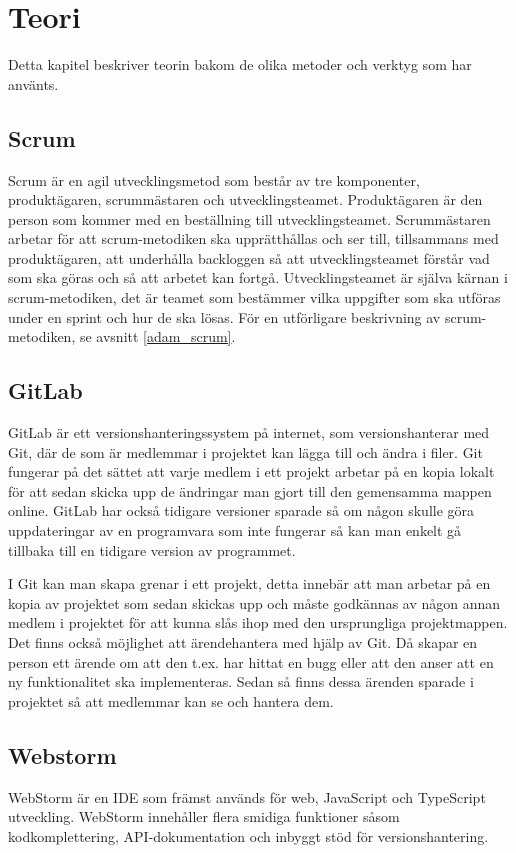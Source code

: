 \chapter{Teori}
Detta kapitel beskriver teorin bakom de olika metoder och verktyg som har använts.

\section{Scrum} \label{scrum}
Scrum är en agil utvecklingsmetod som består av tre komponenter, produktägaren, scrummästaren och utvecklingsteamet. 
Produktägaren är den person som kommer med en beställning till utvecklingsteamet. 
Scrummästaren arbetar för att scrum-metodiken ska upprätthållas och ser till, tillsammans med produktägaren, att underhålla backloggen så att utvecklingsteamet förstår vad som ska göras och så att arbetet kan fortgå. 
Utvecklingsteamet är själva kärnan i scrum-metodiken, det är teamet som bestämmer vilka uppgifter som ska utföras under en sprint och hur de ska lösas. 
För en utförligare beskrivning av scrum-metodiken, se avsnitt \ref{adam_scrum}.

\section{GitLab}
GitLab är ett versionshanteringssystem på internet, som versionshanterar med Git, där de som är medlemmar i projektet kan lägga till och ändra i filer. 
Git fungerar på det sättet att varje medlem i ett projekt arbetar på en kopia lokalt för att sedan skicka upp de ändringar man gjort till den gemensamma mappen online. 
GitLab har också tidigare versioner sparade så om någon skulle göra uppdateringar av en programvara som inte fungerar så kan man enkelt gå tillbaka till en tidigare version av programmet.

I Git kan man skapa grenar i ett projekt, detta innebär att man arbetar på en kopia av projektet som sedan skickas upp och måste godkännas av någon annan medlem i projektet för att kunna slås ihop med den ursprungliga projektmappen. 
Det finns också möjlighet att ärendehantera med hjälp av Git. 
Då skapar en person ett ärende om att den t.ex. har hittat en bugg eller att den anser att en ny funktionalitet ska implementeras. 
Sedan så finns dessa ärenden sparade i projektet så att medlemmar kan se och hantera dem. \cite{gitlab}

\section{Webstorm}
WebStorm är en IDE som främst används för web, JavaScript och TypeScript utveckling. WebStorm innehåller flera smidiga funktioner såsom kodkomplettering, API-dokumentation och inbyggt stöd för versionshantering. \cite{webstorm}

